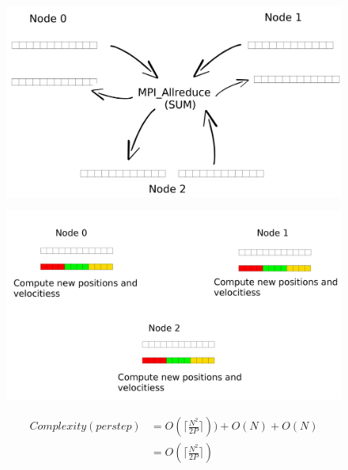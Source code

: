 \documentclass[a4paper]{article}
\begin{document}
\begin{figure}[H]
\centering
\begin{minipage}{.5\textwidth}
  \centering
  \includegraphics[width=1\linewidth]{MPI_all_reduce}
  \label{fig:C2}
\end{minipage}%
\begin{minipage}{.5\textwidth}
  \centering
  \includegraphics[width=1\linewidth]{compute_positions}
  \label{fig:D2}
\end{minipage}
\end{figure}
\FloatBarrier

\newpage

\begin{equation} \label{eq:comp_app1}
\begin{split}
Complexity (per step) & = O(\lceil\frac{N^2}{2P}\rceil)) + O(N) + O(N)\\
 & = O(\lceil\frac{N^2}{2P}\rceil)
\end{split}
\end{equation}
\end{document}
